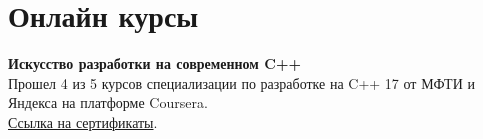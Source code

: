 \documentclass{resume}
\begin{document}
\section{Онлайн курсы}
\resumeSubHeadingListStart
\item{\textbf{Искусство разработки на современном C++} \\
Прошел 4 из 5 курсов специализации по разработке на C++ 17 от МФТИ и Яндекса на платформе Coursera. \\
\href{https://github.com/SalavatD/SalavatD.github.io/tree/master/\%D0\%98\%D1\%81\%D0\%BA\%D1\%83\%D1\%81\%D1\%81\%D1\%82\%D0\%B2\%D0\%BE\%20\%D1\%80\%D0\%B0\%D0\%B7\%D1\%80\%D0\%B0\%D0\%B1\%D0\%BE\%D1\%82\%D0\%BA\%D0\%B8\%20\%D0\%BD\%D0\%B0\%20\%D1\%81\%D0\%BE\%D0\%B2\%D1\%80\%D0\%B5\%D0\%BC\%D0\%B5\%D0\%BD\%D0\%BD\%D0\%BE\%D0\%BC\%20C\%2B\%2B}{\color{blue}Ссылка на сертификаты}.}
\resumeSubHeadingListEnd
\end{document}
